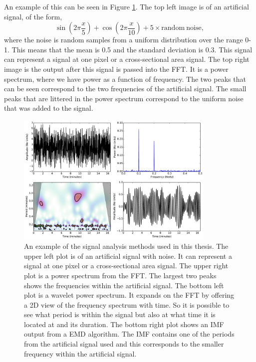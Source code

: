     An example of this can be seen in Figure \ref{fig:signal_overview}.
    The top left image is of an artificial signal, of the form, $$\sin\left(2\pi \frac{x}{5}\right) + \cos\left(2\pi \frac{x}{10}\right) + 5\times\mathrm{random\ noise},$$ where the noise is random samples from a uniform distribution over the range 0-1.
    This means that the mean is 0.5 and the standard deviation is $0.3$.
    This signal can represent a signal at one pixel or a cross-sectional area signal.
    The top right image is the output after this signal is passed into the FFT.
    It is a power spectrum, where we have power as a function of frequency.
    The two peaks that can be seen correspond to the two frequencies of the artificial signal.
    The small peaks that are littered in the power spectrum correspond to the uniform noise that was added to the signal.
    
   	\begin{figure}
           \centering
           \includegraphics[width=0.85\textwidth]{signal_overview.pdf}
           \caption{
                   An example of the signal analysis methods used in this thesis. 
                   The upper left plot is of an artificial signal with noise.
                   It can represent a signal at one pixel or a cross-sectional area signal.
                   The upper right plot is a power spectrum from the FFT.
                   The largest two peaks shows the frequencies within the artificial signal.
                   The bottom left plot is a wavelet power spectrum.
                   It expands on the FFT by offering a 2D view of the frequency spectrum with time.
                   So it is possible to see what period is within the signal but also at what time it is located at and its duration.
                   The bottom right plot shows an IMF output from a EMD algorithm.
                   The IMF contains one of the periods from the artificial signal used and this corresponds to the smaller frequency within the artificial signal.
                   }
              \label{fig:signal_overview}
     \end{figure}
	
